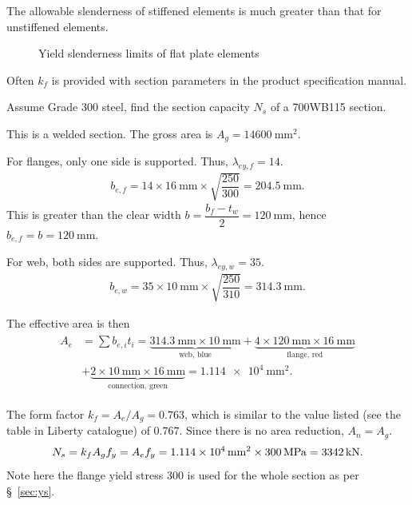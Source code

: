 The allowable slenderness of stiffened elements is much greater than that for unstiffened elements.
\begin{figure}[H]
\centering

\caption{Yield slenderness limits of flat plate elements}\label{fig:flat_slenderness}
\end{figure}

Often $k_f$ is provided with section parameters in the product specification manual.

\begin{exmp}
Assume Grade 300 steel, find the section capacity $N_s$ of a 700WB115 section.
\end{exmp}
\begin{solution}
\begin{minipage}{5cm}\centering
\end{minipage}
\begin{minipage}{.99\linewidth-5cm}
This is a welded section. The gross area is $A_g=\SI{14600}{\mm^2}$.

For flanges, only one side is supported. Thus, $\lambda_{ey,f}=14$.
\begin{gather*}
b_{e,f}=14\times\SI{16}{\mm}\times\sqrt{\dfrac{250}{300}}=\SI{204.5}{\mm}.
\end{gather*}
This is greater than the clear width $b=\dfrac{b_f-t_w}{2}=\SI{120}{\mm}$, hence $b_{e,f}=b=\SI{120}{\mm}$.

For web, both sides are supported. Thus, $\lambda_{ey,w}=35$.
\begin{gather*}
b_{e,w}=35\times\SI{10}{\mm}\times\sqrt{\dfrac{250}{310}}=\SI{314.3}{\mm}.
\end{gather*}
\end{minipage}

The effective area is then
\begin{gather*}
\begin{split}
A_e&=\sum{}b_{e,i}t_i=\underbrace{\SI{314.3}{\mm}\times\SI{10}{\mm}}_\text{web, blue}+\underbrace{4\times\SI{120}{\mm}\times\SI{16}{\mm}}_\text{flange, red}\\
&+\underbrace{2\times\SI{10}{\mm}\times\SI{16}{\mm}}_\text{connection, green}=\SI{1.114e4}{\mm^2}.
\end{split}
\end{gather*}

The form factor $k_f=A_e/A_g=0.763$, which is similar to the value listed (see the table in Liberty catalogue) of $0.767$. Since there is no area reduction, $A_n=A_g$.
\begin{gather*}
N_s=k_fA_gf_y=A_ef_y=\SI{1.114e4}{\milli\meter^2}\times\SI{300}{\mega\pascal}=\SI{3342}{\kilo\newton}.
\end{gather*}
Note here the flange yield stress \SI{300}{\mpa} is used for the whole section as per \S~\ref{sec:ys}.
\end{solution}
